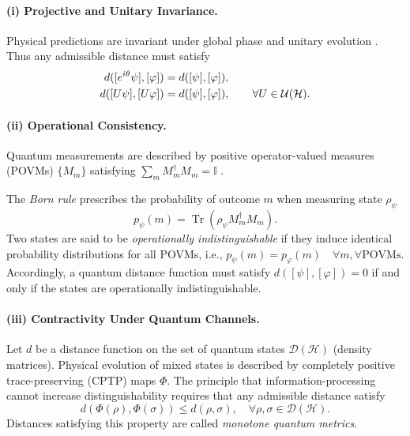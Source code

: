 \documentclass[aps,pra,reprint,nofootinbib,showpacs,superscriptaddress]{revtex4-1}
\begin{document}
\paragraph{(i) Projective and Unitary Invariance.} Physical predictions are invariant under global phase and
unitary evolution \cite{peres1997quantum,nielsen2010quantum}.
Thus any admissible distance must satisfy
\begin{align}\notag
d([e^{i\theta}\psi],[\varphi])
&=
d([\psi],[\varphi]),\\\notag
d([U\psi],[U\varphi])
&=
d([\psi],[\varphi]),
\qquad
\forall U\in\mathcal{U}(\mathcal{H}).
\end{align}

\paragraph{(ii) Operational Consistency.}

Quantum measurements are described by positive operator-valued measures (POVMs)
$\{M_m\}$ satisfying
\(\sum_m M_m^\dagger M_m = \mathbb{I}\) \cite{Holevo2011,nielsen2010quantum}.

The \emph{Born rule} prescribes the probability of outcome \(m\) when measuring
state $\rho_\psi$
\[
p_\psi(m) = \operatorname{Tr}(\rho_\psi M_m^\dagger M_m).
\]
Two states are said to be \emph{operationally indistinguishable} if they
induce identical probability distributions for all POVMs, i.e., \(p_\psi(m) = p_\varphi(m) \quad \forall m, \forall \text{POVMs}.
\)
Accordingly, a quantum distance function must satisfy
\(
d([\psi],[\varphi]) = 0\) if and only if the states are operationally indistinguishable.


\paragraph{(iii) Contractivity Under Quantum Channels.}

Let $d$ be a distance function on the set of quantum states
$\mathcal{D}(\mathcal{H})$ (density matrices). Physical evolution
of mixed states is described by completely positive trace-preserving
(CPTP) maps $\Phi$. The principle that information-processing cannot increase
distinguishability requires that any admissible distance satisfy
\cite{petz1996monotone}
\[
d(\Phi(\rho),\Phi(\sigma)) \le d(\rho,\sigma), \quad
\forall \rho,\sigma \in \mathcal{D}(\mathcal{H}).
\]
Distances satisfying this property are called \emph{monotone quantum metrics}.

\end{document}
